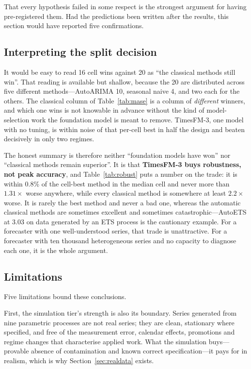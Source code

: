 \documentclass[article]{ajs}
\providecommand{\sectionref}[1]{Section~\ref{#1}}
\providecommand{\tableref}[1]{Table~\ref{#1}}
\begin{document}
That every hypothesis failed in some respect is the strongest argument for having pre-registered
them. Had the predictions been written after the results, this section would have reported five
confirmations.

\subsection{Interpreting the split decision}

It would be easy to read 16 cell wins against 20 as ``the classical methods still win''. That
reading is available but shallow, because the 20 are distributed across five different
methods---AutoARIMA 10, seasonal naive 4, and two each for the others. The classical column of
\tableref{tab:mase} is a column of \emph{different} winners, and which one wins is not knowable
in advance without the kind of model-selection work the foundation model is meant to remove.
TimesFM-3, one model with no tuning, is within noise of that per-cell best in half the design
and beaten decisively in only two regimes.

The honest summary is therefore neither ``foundation models have won'' nor ``classical methods
remain superior''. It is that \textbf{TimesFM-3 buys robustness, not peak accuracy}, and
\tableref{tab:robust} puts a number on the trade: it is within 0.8\% of the cell-best method in
the median cell and never more than $1.31\times$ worse anywhere, while every classical method is
somewhere at least $2.2\times$ worse. It is rarely the best method and never a bad one, whereas
the automatic classical methods are sometimes excellent and sometimes catastrophic---AutoETS at
3.03 on data generated by an ETS process is the cautionary example. For a forecaster with one
well-understood series, that trade is unattractive. For a forecaster with ten thousand
heterogeneous series and no capacity to diagnose each one, it is the whole argument.

\subsection{Limitations}

Five limitations bound these conclusions.

First, the simulation tier's strength is also its boundary. Series generated from nine
parametric processes are not real series; they are clean, stationary where specified, and free
of the measurement error, calendar effects, promotions and regime changes that characterise
applied work. What the simulation buys---provable absence of contamination and known correct
specification---it pays for in realism, which is why \sectionref{sec:realdata} exists.
\end{document}
